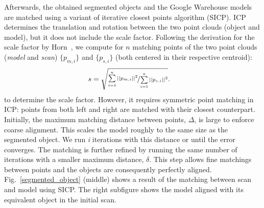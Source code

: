 \documentclass{llncs}
\begin{document}
Afterwards, the obtained segmented objects and the Google Warehouse
models are matched using a variant of iterative closest points
algorithm (SICP). ICP determines the translation and rotation between
the two point clouds (object and model), but it does not include the
scale factor. Following the derivation for the scale factor by
Horn~\cite{Horn:1987}, we compute for $n$ matching points of the two
point clouds (\emph{model} and \emph{scan}) $\{p_{m,i}\}$ and $\{p_{s,
  i}\}$ (both centered in their respective centroid):
%
\begin{align*}
  & s = \sqrt{\nicefrac{\sum\limits_{i=1}^n ||p_{m,i}||^2}{\sum\limits_{i=1}^n ||p_{s,i}||^2}}.
\end{align*}
to determine the scale factor. However, it requires symmetric point
matching in ICP: points from both left and right are matched with
their closest counterpart. Initially, the maximum matching distance
between points, $\Delta$, is large to enforce coarse alignment. This
scales the model roughly to the same size as the segmented object. We
run \emph{i} iterations with this distance or until the error
converges. The matching is further refined by running the same number
of iterations with a smaller maximum distance, $\delta$. This step
allows fine matchings between points and the objects are consequently
perfectly aligned. Fig.~\ref{segmented_object} (middle) shows a
result of the matching between scan and model using SICP.  The right
subfigure shows the model aligned with its equivalent object in the
initial scan.

\end{document}
